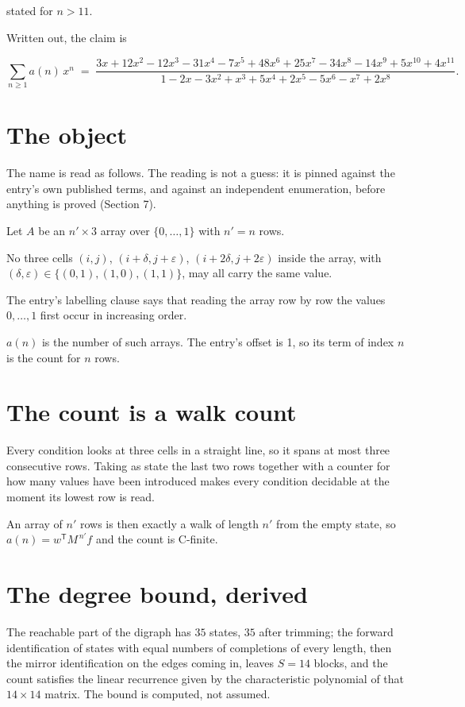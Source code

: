\documentclass[11pt]{article}
\theoremstyle{definition}
\begin{document}
stated for $n > 11$.

Written out, the claim is

\[\sum_{n \ge 1} a(n)\,x^n \;=\; \frac{3x + 12x^{2} - 12x^{3} - 31x^{4} - 7x^{5} + 48x^{6} + 25x^{7} - 34x^{8} - 14x^{9} + 5x^{10} + 4x^{11}}{1 - 2x - 3x^{2} + x^{3} + 5x^{4} + 2x^{5} - 5x^{6} - x^{7} + 2x^{8}}.\]

\section{The object}

The name is read as follows. The reading is not a guess: it is pinned against the entry's own published terms, and against an independent enumeration, before anything is proved (Section 7).

Let $A$ be an $n' \times 3$ array over $\{0,\dots,1\}$ with $n' = n$ rows.

No three cells $(i,j)$, $(i{+}\delta,j{+}\varepsilon)$, $(i{+}2\delta,j{+}2\varepsilon)$ inside the array, with $(\delta,\varepsilon) \in \{(0,1), (1,0), (1,1)\}$, may all carry the same value.

The entry's labelling clause says that reading the array row by row the values $0,\dots,1$ first occur in increasing order.

$a(n)$ is the number of such arrays. The entry's offset is 1, so its term of index $n$ is the count for $n$ rows.

\section{The count is a walk count}

Every condition looks at three cells in a straight line, so it spans at most three consecutive rows. Taking as state the last two rows together with a counter for how many values have been introduced makes every condition decidable at the moment its lowest row is read.

An array of $n'$ rows is then exactly a walk of length $n'$ from the empty state, so $a(n) = w^{\mathsf T}M^{\,n'}f$ and the count is C-finite.

\section{The degree bound, derived}

The reachable part of the digraph has $35$ states, $35$ after trimming; the forward identification of states with equal numbers of completions of every length, then the mirror identification on the edges coming in, leaves $S = 14$ blocks, and the count satisfies the linear recurrence given by the characteristic polynomial of that $14\times14$ matrix. The bound is computed, not assumed.
\end{document}
